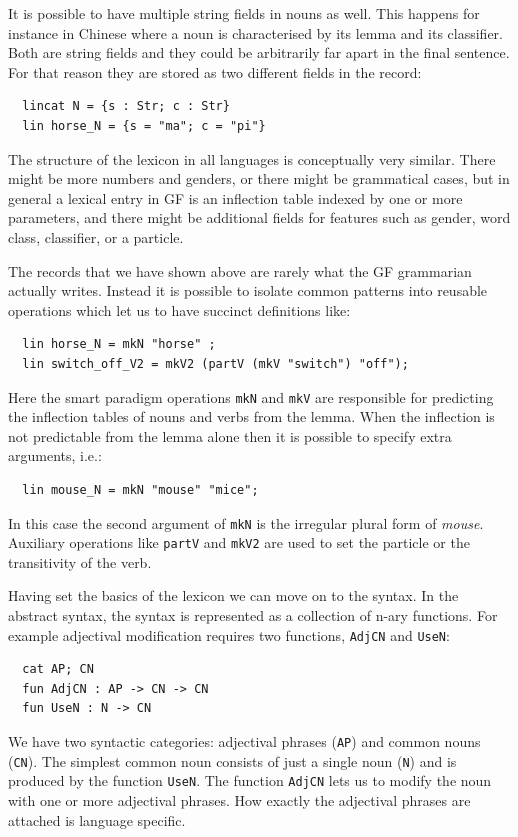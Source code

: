 \documentclass[output=paper]{LSP/langsci}
\begin{document}
It is possible to have multiple string fields in nouns as well. This happens for instance in Chinese where a noun is characterised by its lemma and its classifier. Both are string fields and they could be arbitrarily far apart in the final sentence. For that reason they are stored as two different fields in the record:
\begin{verbatim}
  lincat N = {s : Str; c : Str}
  lin horse_N = {s = "ma"; c = "pi"}
\end{verbatim}

The structure of the lexicon in all languages is 
conceptually very similar. There might be more numbers and genders, 
or there might be grammatical cases, but in general a lexical entry in 
GF is an inflection table indexed by one or more parameters, and 
there might be additional fields for features such as gender, 
word class, classifier, or a particle. 

The records that we have shown above are rarely what 
the GF grammarian actually writes. Instead it is possible to 
isolate common patterns into reusable operations which let us to 
have succinct definitions like:
\begin{verbatim}
  lin horse_N = mkN "horse" ;
  lin switch_off_V2 = mkV2 (partV (mkV "switch") "off");
\end{verbatim}
Here the smart paradigm \citep{dblp:conf/eacl/detrezr12} operations 
\verb=mkN= and \verb=mkV= are responsible for predicting 
the inflection tables of nouns and verbs from the lemma. 
When the inflection is not predictable from the lemma alone then 
it is possible to specify extra arguments, i.e.:
\begin{verbatim}
  lin mouse_N = mkN "mouse" "mice";
\end{verbatim}
In this case the second argument of \verb=mkN= is 
the irregular plural form of \textit{mouse}. Auxiliary operations 
like \verb=partV= and \verb=mkV2= are used to set the particle or 
the transitivity of the verb.

Having set the basics of the lexicon we can move on to the syntax. 
In the abstract syntax, the syntax is represented as a collection of 
n-ary functions. For example adjectival modification requires two 
functions, \verb=AdjCN= and \verb=UseN=:
\begin{verbatim}
  cat AP; CN
  fun AdjCN : AP -> CN -> CN
  fun UseN : N -> CN
\end{verbatim}
We have two syntactic categories: adjectival phrases (\verb=AP=) and 
common nouns (\verb=CN=). The simplest common noun consists of just 
a single noun (\verb=N=) and is produced by the function \verb=UseN=. 
The function \verb=AdjCN= lets us to modify the noun with one or 
more adjectival phrases. How exactly the adjectival phrases are
attached is language specific.
\end{document}
